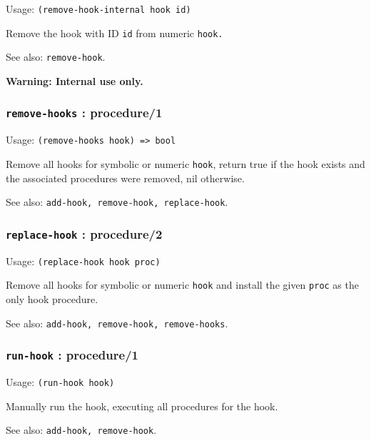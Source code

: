 \documentclass[
]{article}
\newcommand{\passthrough}[1]{#1}
\begin{document}
Usage: \passthrough{\lstinline!(remove-hook-internal hook id)!}

Remove the hook with ID \passthrough{\lstinline!id!} from numeric
\passthrough{\lstinline!hook.!}

See also: \passthrough{\lstinline!remove-hook!}.

\textbf{Warning: Internal use only.}

\hypertarget{remove-hooks-procedure1}{%
\subsubsection{\texorpdfstring{\texttt{remove-hooks} :
procedure/1}{remove-hooks : procedure/1}}\label{remove-hooks-procedure1}}

Usage: \passthrough{\lstinline!(remove-hooks hook) => bool!}

Remove all hooks for symbolic or numeric \passthrough{\lstinline!hook!},
return true if the hook exists and the associated procedures were
removed, nil otherwise.

See also: \passthrough{\lstinline!add-hook, remove-hook, replace-hook!}.

\hypertarget{replace-hook-procedure2}{%
\subsubsection{\texorpdfstring{\texttt{replace-hook} :
procedure/2}{replace-hook : procedure/2}}\label{replace-hook-procedure2}}

Usage: \passthrough{\lstinline!(replace-hook hook proc)!}

Remove all hooks for symbolic or numeric \passthrough{\lstinline!hook!}
and install the given \passthrough{\lstinline!proc!} as the only hook
procedure.

See also: \passthrough{\lstinline!add-hook, remove-hook, remove-hooks!}.

\hypertarget{run-hook-procedure1}{%
\subsubsection{\texorpdfstring{\texttt{run-hook} :
procedure/1}{run-hook : procedure/1}}\label{run-hook-procedure1}}

Usage: \passthrough{\lstinline!(run-hook hook)!}

Manually run the hook, executing all procedures for the hook.

See also: \passthrough{\lstinline!add-hook, remove-hook!}.
\end{document}
